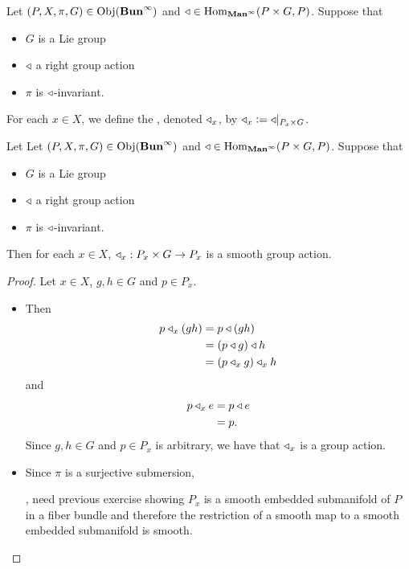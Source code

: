 \documentclass{book}
\begin{document}
\begin{defn}
	Let $(P, X, \pi, G) \in \operatorname{Obj}(\operatorname*{\text{\textbf{Bun}}^{\infty}})$ and $\triangleleft \in \operatorname{Hom}_{\operatorname*{\text{\textbf{Man}}^{\infty}}}(P \times G, P)$. Suppose that
	\begin{itemize}
		\item $G$ is a Lie group 
		\item $\triangleleft$ a right group action
		\item $\pi$ is $\triangleleft$-invariant.
	\end{itemize} 
	For each $x \in X$, we define the , denoted $\triangleleft_x$, by $\triangleleft_x \vcentcolon= \triangleleft|_{P_x \times G}$. 
\end{defn}

\begin{ex}
	Let Let $(P, X, \pi, G) \in \operatorname{Obj}(\operatorname*{\text{\textbf{Bun}}^{\infty}})$ and $\triangleleft \in \operatorname{Hom}_{\operatorname*{\text{\textbf{Man}}^{\infty}}}(P \times G, P)$. Suppose that \begin{itemize}
		\item $G$ is a Lie group 
		\item $\triangleleft$ a right group action
		\item $\pi$ is $\triangleleft$-invariant.
	\end{itemize}  
	Then for each $x \in X$, $\triangleleft_x : P_x \times G \rightarrow P_x$ is a smooth group action.
\end{ex}

\begin{proof}
	Let $x \in X$, $g,h \in G$ and $p \in P_x$.
	\begin{itemize}
		\item Then
		\begin{align*}
			p \triangleleft_x (g h)
			& = p \triangleleft (gh) \\
			& = (p \triangleleft g) \triangleleft h \\
			& = (p \triangleleft_x g) \triangleleft_x h
		\end{align*}
		and 
		\begin{align*}
			p \triangleleft_x e
			& = p \triangleleft e \\
			& = p.
		\end{align*}
		Since $g,h \in G$ and $p \in P_x$ is arbitrary, we have that $\triangleleft_x $ is a group action.
		\item Since $\pi$ is a surjective submersion,
		
		, need previous exercise showing $P_x$ is a smooth embedded submanifold of $P$ in a fiber bundle and therefore the restriction of a smooth map to a smooth embedded submanifold is smooth.
	\end{itemize} 
\end{proof}
\end{document}
